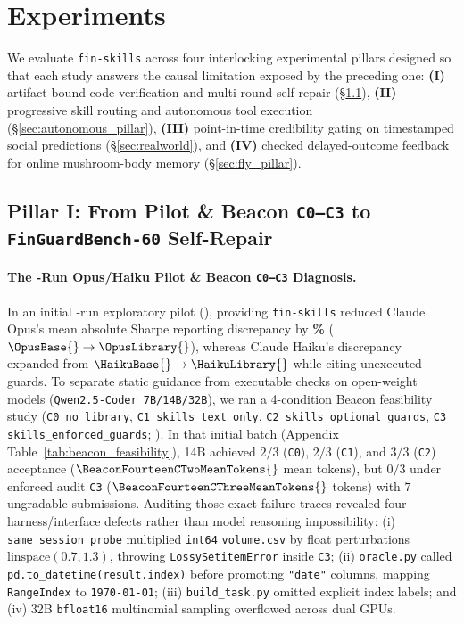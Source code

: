 \section{Experiments}
\label{sec:experiment}

We evaluate \texttt{fin-skills} across four interlocking experimental pillars designed so that each study answers the causal limitation exposed by the preceding one: \textbf{(I)} artifact-bound code verification and multi-round self-repair (\S\ref{sec:pilot}), \textbf{(II)} progressive skill routing and autonomous tool execution (\S\ref{sec:autonomous_pillar}), \textbf{(III)} point-in-time credibility gating on timestamped social predictions (\S\ref{sec:realworld}), and \textbf{(IV)} checked delayed-outcome feedback for online mushroom-body memory (\S\ref{sec:fly_pillar}).

\subsection{Pillar I: From Pilot \& Beacon \texttt{C0--C3} to \texttt{FinGuardBench-60} Self-Repair}
\label{sec:pilot}

\paragraph{The \PilotRuns{}-Run Opus/Haiku Pilot \& Beacon \texttt{C0--C3} Diagnosis.}
In an initial \PilotRuns{}-run exploratory pilot (), providing \texttt{fin-skills} reduced Claude Opus's mean absolute Sharpe reporting discrepancy by \textbf{\OpusReduction{}\%} ($\OpusBase{} \to \OpusLibrary{}$), whereas Claude Haiku's discrepancy expanded from $\HaikuBase{} \to \HaikuLibrary{}$ while citing unexecuted guards. To separate static guidance from executable checks on open-weight models (\texttt{Qwen2.5-Coder 7B/14B/32B}), we ran a 4-condition Beacon feasibility study (\texttt{C0 no\_library}, \texttt{C1 skills\_text\_only}, \texttt{C2 skills\_optional\_guards}, \texttt{C3 skills\_enforced\_guards}; ). In that initial batch (Appendix Table~\ref{tab:beacon_feasibility}), 14B achieved $2/3$ (\texttt{C0}), $2/3$ (\texttt{C1}), and $3/3$ (\texttt{C2}) acceptance ($\BeaconFourteenCTwoMeanTokens{}$ mean tokens), but $0/3$ under enforced audit \texttt{C3} ($\BeaconFourteenCThreeMeanTokens{}$ tokens) with $7$ ungradable submissions. Auditing those exact failure traces revealed four harness/interface defects rather than model reasoning impossibility: (i) \texttt{same\_session\_probe} multiplied \texttt{int64} \texttt{volume.csv} by float perturbations $\text{linspace}(0.7,1.3)$, throwing \texttt{LossySetitemError} inside \texttt{C3}; (ii) \texttt{oracle.py} called \texttt{pd.to\_datetime(result.index)} before promoting \texttt{"date"} columns, mapping \texttt{RangeIndex} to \texttt{1970-01-01}; (iii) \texttt{build\_task.py} omitted explicit index labels; and (iv) 32B \texttt{bfloat16} multinomial sampling overflowed across dual GPUs.

